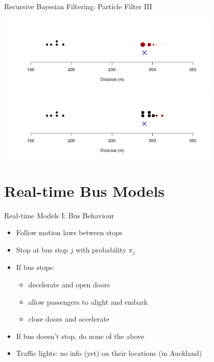 \documentclass[10pt,t]{beamer}
\begin{document}
\begin{frame}{Recursive Bayesian Filtering: Particle Filter III}
\begin{overprint}
    \centering
    \includegraphics[width=0.8\textwidth]{figs/pf1-frame5.png}
    \centering
    \includegraphics[width=0.8\textwidth]{figs/pf1-frame6.png}
  \end{overprint}
  \onslide<+->
\end{frame}


\section{Real-time Bus Models}

\begin{frame}{Real-time Models I: Bus Behaviour}
  \onslide<+->
  \begin{itemize}[<+->]
  \item Follow motion laws between stops
  \item Stop at bus stop $j$ with probability $\pi_j$
  \item If bus stops:
    \begin{itemize}[<1->]
    \item decelerate and open doors
    \item allow passengers to alight and embark
    \item close doors and accelerate
    \end{itemize}
  \item If bus doesn't stop, do none of the above
  \item Traffic lights: no info (yet) on their locations (in Auckland)
  \end{itemize}
\end{frame}
\end{document}
